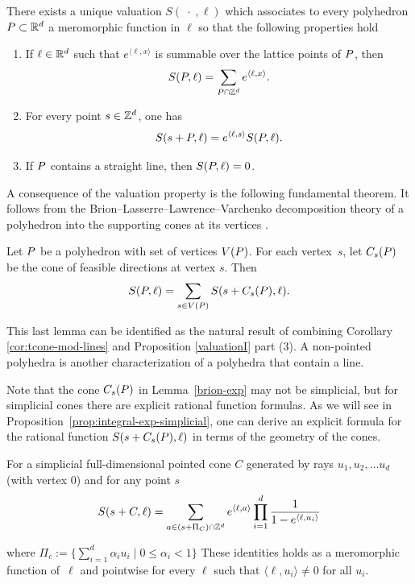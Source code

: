 \begin{proposition}\label{valuationI}
There exists a unique valuation  $S(\;\cdot\;,\ell)$ which  associates  to every polyhedron
${ P}\subset {\mathbb R}^d$ a meromorphic function in $\ell$ so that the following properties hold 

\begin{enumerate}
\item If $\ell \in {\mathbb R}^d$ such that $e^{\langle \ell, x\rangle}$ is summable over the lattice points of ${ P}$, then
$$
S({ P},\ell)= \sum_{{ P} \cap {\mathbb Z}^d} e^{\langle \ell,x\rangle}.
$$

\item For every point $s \in {\mathbb Z}^d$, one has
$$
S(s+{ P},\ell) = e^{\langle \ell,s\rangle}S({ P},\ell).
$$
\item If ${ P}$ contains a straight line, then $S({ P},\ell)=0$.
\end{enumerate}
\end{proposition}


A consequence of the valuation property is the following fundamental theorem. 
It follows from the Brion--Lasserre--Lawrence--Varchenko decomposition theory of a
polyhedron into the supporting cones at its vertices \cite{beck-haase-sottile:theorema, Brion88,barvinokzurichbook, lasserre-volume1983}.


\begin{lemma} \label{brion-exp} Let ${ P}$ be a polyhedron with set of vertices $V({ P})$. For each
vertex~$s$, let $C_s({ P})$ be the cone of feasible directions at vertex $s$. Then
\begin{equation*}
S({ P},\ell)=\sum_{s\in V({ P})}S(s+C_s({ P}),\ell).
\end{equation*}
\end{lemma}

This last lemma can be identified as the natural result of combining Corollary \ref{cor:tcone-mod-lines} and Proposition \ref{valuationI} part (3). A non-pointed polyhedra is another characterization of  a polyhedra that contain a line.


Note that the cone $C_s({ P})$ in Lemma~\ref{brion-exp} may not be simplicial, but for simplicial cones there are explicit rational function formulas. As we will see in Proposition~\ref{prop:integral-exp-simplicial}, one can derive an explicit formula for 
the rational function $S(s+C_s({ P}),\ell)$ in terms of the geometry of the cones.

\begin{proposition} 
  \label{prop:summation-exp-simplicial}
  For a simplicial full-dimensional pointed cone $C$ generated by rays $u_1,u_2,\dots u_d$ (with vertex $0$) and for any point $s$
\begin{equation*}
S(s+C,\ell)
=\sum_{a \in (s+\Pi_C) \cap {\mathbb Z}^d} e^{\langle \ell, a
  \rangle} \prod_{i=1}^d \frac1{1- e^{\langle \ell, u_i \rangle}}
\end{equation*}

where $\Pi_c := \{ \sum_{i=1}^d \alpha_i u_i \mid 0 \leq \alpha_i < 1\}$
These identities holds as a meromorphic function of~$\ell$ 
and pointwise for every $\ell$ such that $\langle \ell, u_i \rangle \neq 0$ for
all $u_i$.
\end{proposition}


